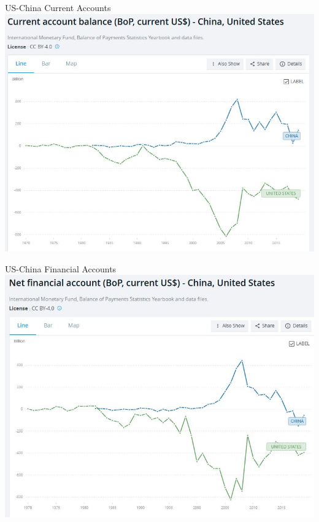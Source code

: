 \documentclass[handout]{beamer}
\begin{document}
\begin{frame}{\LARGE US-China Current Accounts}
	\centering
	\includegraphics[width=\textwidth,height=0.8\textheight,keepaspectratio]{US-China current account.JPG}
\end{frame}

\begin{frame}{\LARGE US-China Financial Accounts}
	\centering
	\includegraphics[width=\textwidth,height=0.8\textheight,keepaspectratio]{US-China financial account.JPG}
\end{frame}
\end{document}
